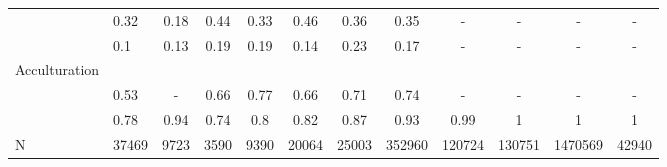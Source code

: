 \documentclass[
]{article}
\begin{document}
\begin{landscape}
\begin{table}[ht]
\begin{tabular}{>{\raggedright\arraybackslash}p{3.2cm}|lcccccc|cccc}
  \multicolumn{1}{>{\raggedleft\arraybackslash}p{2.2cm}|}{\makebox[2.2cm][r]{1980 - 1999 }}& 0.32 & 0.18 & 0.44 & 0.33 & 0.46 & 0.36 & 0.35 & - & - & - & - \\ 
  \multicolumn{1}{>{\raggedleft\arraybackslash}p{2.1cm}|}{\makebox[2.1cm][r]{After 1999 }}& 0.1 & 0.13 & 0.19 & 0.19 & 0.14 & 0.23 & 0.17 & - & - & - & - \\ 
  Acculturation &  &  &  &  &  &  &  &  &  &  &  \\ 
  \multicolumn{1}{>{\raggedleft\arraybackslash}p{1.6cm}|}{\makebox[1.6cm][r]{Citizen }}& 0.53 & - & 0.66 & 0.77 & 0.66 & 0.71 & 0.74 & - & - & - & - \\ 
  \multicolumn{1}{>{\raggedleft\arraybackslash}p{3cm}|}{\makebox[3cm][r]{English Speakers }}& 0.78 & 0.94 & 0.74 & 0.8 & 0.82 & 0.87 & 0.93 & 0.99 & 1 & 1 & 1 \\ 
  N & 37469 & 9723 & 3590 & 9390 & 20064 & 25003 & 352960 & 120724 & 130751 & 1470569 & 42940 \\ 
   \hline
\end{tabular}
\endgroup
\end{table}



\end{landscape}
\end{document}
